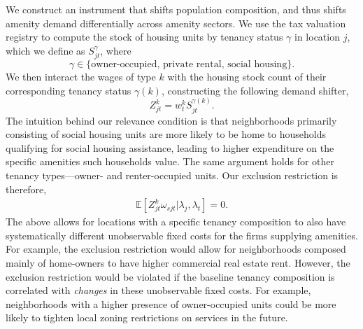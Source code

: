 \documentclass[11pt]{article}
\newcommand{\E}{\mathbb{E}}
\begin{document}
We construct an instrument that shifts population composition, and thus shifts amenity demand differentially across amenity sectors. We use the tax valuation registry to compute the stock of housing units by tenancy status $\gamma$ in location $j$, which we define as $S_{jt}^{\gamma}$, where 
\[\gamma \in \{ \text{owner-occupied, private rental, social housing}\}.\] We then interact the wages of type $k$ with the housing stock count of their corresponding tenancy status $\gamma(k)$, constructing the following demand shifter,
\[  Z^k_{jt} = w^k_tS_{jt}^{\gamma(k)}.\]
The intuition behind our relevance condition is that neighborhoods primarily consisting of social housing units are more likely to be home to households qualifying for social housing assistance, leading to higher expenditure on the specific amenities such households value. The same argument holds for other tenancy types---owner- and renter-occupied units. Our exclusion restriction is therefore,
\begin{align}\label{eq: exclusion restriction - amenity estimation}
    \E[Z_{jt}^{k}\omega_{sjt}| \lambda_j, \lambda_t] = 0.
\end{align}
The above allows for locations with a specific tenancy composition to also have systematically different unobservable fixed costs for the firms supplying amenities. For example, the exclusion restriction would allow for neighborhoods composed mainly of home-owners to have higher commercial real estate rent. However, the exclusion restriction would be violated if the baseline tenancy composition is correlated with \emph{changes} in these unobservable fixed costs. For example, neighborhoods with a higher presence of owner-occupied units could be more likely to tighten local zoning restrictions on services in the future.
\end{document}
